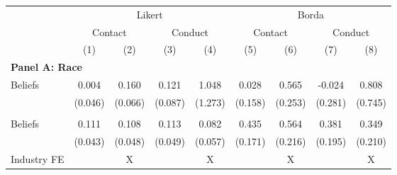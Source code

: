 \begin{tabular}{lcccccccc}
\toprule
 & \multicolumn{4}{c}{Likert} & \multicolumn{4}{c}{Borda} \\
\cmidrule(lr){2-5} \cmidrule(lr){6-9}
 & \multicolumn{2}{c}{Contact} & \multicolumn{2}{c}{Conduct} & \multicolumn{2}{c}{Contact} & \multicolumn{2}{c}{Conduct} \\
\cmidrule(lr){2-3} \cmidrule(lr){4-5} \cmidrule(lr){6-7} \cmidrule(lr){8-9}
 & (1) & (2) & (3) & (4) & (5) & (6) & (7) & (8)
\\
\midrule
\multicolumn{9}{l}{\textbf{Panel A: Race}} \\
Beliefs & 0.004 & 0.160 & 0.121 & 1.048 & 0.028 & 0.565 & -0.024 & 0.808
\\
 & (0.046) & (0.066) & (0.087) & (1.273) & (0.158) & (0.253) & (0.281) & (0.745)
\\
\addlinespace
\multicolumn{9}{l}{\textbf{Panel B: Gender}} \\
Beliefs & 0.111 & 0.108 & 0.113 & 0.082 & 0.435 & 0.564 & 0.381 & 0.349
\\
 & (0.043) & (0.048) & (0.049) & (0.057) & (0.171) & (0.216) & (0.195) & (0.210)
\\
\addlinespace
Industry FE &  & X &  & X &  & X &  & X
\\
\bottomrule
\end{tabular}
